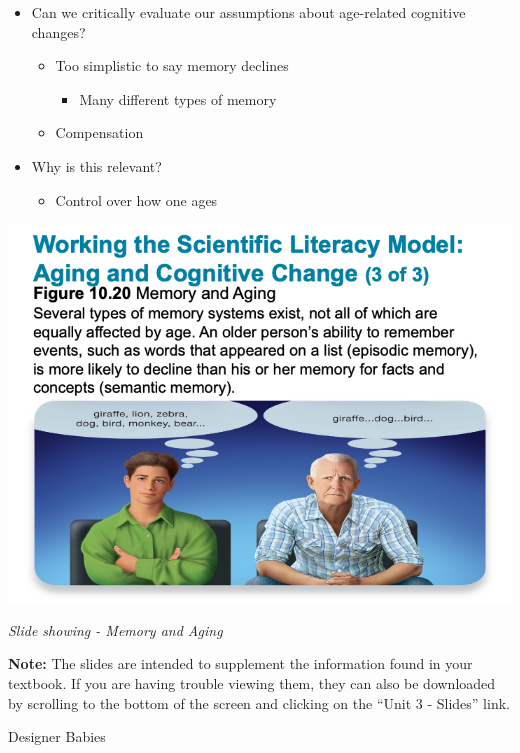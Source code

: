 \documentclass[
]{book}
\providecommand{\tightlist}{%
  \setlength{\itemsep}{0pt}\setlength{\parskip}{0pt}}
\begin{document}
\begin{reflect}
\begin{itemize}
\tightlist
\item
  Can we critically evaluate our assumptions about age-related cognitive changes?

  \begin{itemize}
  \tightlist
  \item
    Too simplistic to say memory declines

    \begin{itemize}
    \tightlist
    \item
      Many different types of memory
    \end{itemize}
  \item
    Compensation
  \end{itemize}
\item
  Why is this relevant?

  \begin{itemize}
  \tightlist
  \item
    Control over how one ages
  \end{itemize}
\end{itemize}

\includegraphics{assets/unit_3/slide_63.png}

\emph{Slide showing - Memory and Aging}

\textbf{Note:} The slides are intended to supplement the information found in your textbook. If you are having trouble viewing them, they can also be downloaded by scrolling to the bottom of the screen and clicking on the ``Unit 3 - Slides'' link.

{Designer Babies}


\end{reflect}
\end{document}
